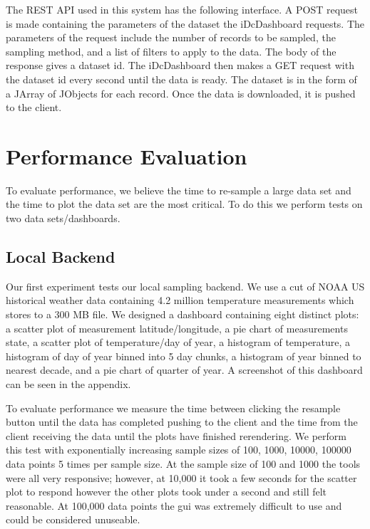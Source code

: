 \documentclass[letter,twocolumn]{article}
\begin{document}
The REST API used in this system has the following interface.
A POST request is made containing the parameters of the dataset the iDcDashboard requests.
The parameters of the request include the number of records to be sampled, the sampling method, and a list of filters to apply to the data.
The body of the response gives a dataset id.
The iDcDashboard then makes a GET request with the dataset id every second until the data is ready.
The dataset is in the form of a JArray of JObjects for each record.
Once the data is downloaded, it is pushed to the client.

\section{Performance Evaluation}%

To evaluate performance, we believe the time to re-sample a large data set and the time to plot the data set are the most critical.
To do this we perform tests on two data sets/dashboards.

\subsection{Local Backend}

Our first experiment tests our local sampling backend.
We use a cut of NOAA US historical weather data containing 4.2 million temperature measurements which stores to a 300 MB file.
We designed a dashboard containing eight distinct plots: a scatter plot of measurement latitude/longitude, a pie chart of measurements state, a scatter plot of temperature/day of year,  a histogram of temperature, a histogram of day of year binned into 5 day chunks, a histogram of year binned to nearest decade, and a pie chart of quarter of year.
A screenshot of this dashboard can be seen in the appendix.

To evaluate performance we measure the time between clicking the resample button until the data has completed pushing to the client and the time from the client receiving the data until the plots have finished rerendering.
We perform this test with exponentially increasing sample sizes of 100, 1000, 10000, 100000 data points 5 times per sample size.
At the sample size of 100 and 1000 the tools were all very responsive; however, at 10,000 it took a few seconds for the scatter plot to respond however the other plots took under a second and still felt reasonable.  
At 100,000 data points the gui was extremely difficult to use and could be considered unuseable.
\end{document}
